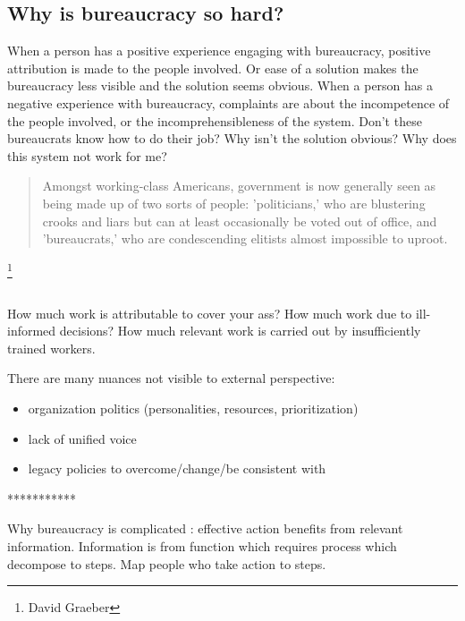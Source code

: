 \subsection{Why is bureaucracy so hard?}

When a person has a positive experience engaging with bureaucracy, positive attribution is made to the people involved. Or ease of a solution makes the bureaucracy less visible and the solution seems obvious. 
When a person has a negative experience with bureaucracy, complaints are about the incompetence of the people involved, or the incomprehensibleness of the system. Don't these bureaucrats know how to do their job? Why isn't the solution obvious? Why does this system not work for me?

\begin{quote}
 Amongst working-class Americans, government is now generally seen as being made up of two sorts of people: 'politicians,' who are blustering crooks and liars but can at least occasionally be voted out of office, and 'bureaucrats,' who are condescending elitists almost impossible to uproot.   
\end{quote}
\footnote{David Graeber}


\ \\


How much work is attributable to cover your ass? How much work due to ill-informed decisions? How much relevant work is carried out by insufficiently trained workers. 


There are many nuances not visible to external perspective:
\begin{itemize}
\item organization politics (personalities, resources, prioritization)
\item lack of unified voice
\item legacy policies to overcome/change/be consistent with
\end{itemize}

***********

Why bureaucracy is complicated : effective action benefits from relevant information. Information is from function which requires process which decompose to steps. Map people who take action to steps.

